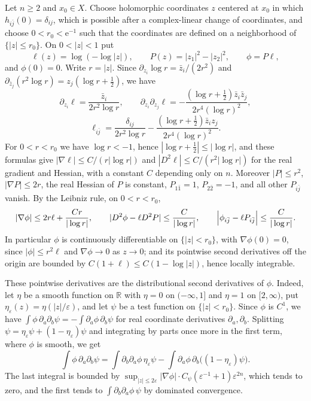 \begin{example}\label{ex:metric-laplacian-unbounded-hessian}
Let $n\geq2$ and $x_0\in X$. Choose holomorphic coordinates $z$ centered at $x_0$ in which $h_{i\bar j}(0)=\delta_{ij}$, which is possible after a complex-linear change of coordinates, and choose $0<r_0<\mathrm e^{-1}$ such that the coordinates are defined on a neighborhood of $\{|z|\leq r_0\}$. On $0<|z|<1$ put
\[
 \ell(z)=\log(-\log|z|),\qquad P(z)=|z_1|^2-|z_2|^2,\qquad \phi=P\ell,
\]
and $\phi(0)=0$. Write $r=|z|$. Since $\partial_{z_i}\log r=\bar z_i/(2r^2)$ and $\partial_{\bar z_j}(r^2\log r)=z_j(\log r+\frac12)$, we have
\[
 \partial_{z_i}\ell=\frac{\bar z_i}{2r^2\log r},\qquad
 \partial_{z_i}\partial_{z_j}\ell=-\frac{(\log r+\frac12)\bar z_i\bar z_j}{2r^4(\log r)^2},
\]
\[
 \ell_{i\bar j}=\frac{\delta_{ij}}{2r^2\log r}-\frac{(\log r+\frac12)\bar z_iz_j}{2r^4(\log r)^2}.
\]
For $0<r<r_0$ we have $\log r<-1$, hence $|\log r+\frac12|\leq|\log r|$, and these formulas give $|\nabla\ell|\leq C/(r|\log r|)$ and $|D^2\ell|\leq C/(r^2|\log r|)$ for the real gradient and Hessian, with a constant $C$ depending only on $n$. Moreover $|P|\leq r^2$, $|\nabla P|\leq2r$, the real Hessian of $P$ is constant, $P_{1\bar1}=1$, $P_{2\bar2}=-1$, and all other $P_{i\bar j}$ vanish. By the Leibniz rule, on $0<r<r_0$,
\[
 |\nabla\phi|\leq2r\ell+\frac{Cr}{|\log r|},\qquad
 |D^2\phi-\ell D^2P|\leq\frac{C}{|\log r|},\qquad
 \Bigl|\phi_{i\bar j}-\ell P_{i\bar j}\Bigr|\leq\frac{C}{|\log r|}.
\]
In particular $\phi$ is continuously differentiable on $\{|z|<r_0\}$, with $\nabla\phi(0)=0$, since $|\phi|\leq r^2\ell$ and $\nabla\phi\to0$ as $z\to0$; and its pointwise second derivatives off the origin are bounded by $C(1+\ell)\leq C(1-\log|z|)$, hence locally integrable.

These pointwise derivatives are the distributional second derivatives of $\phi$. Indeed, let $\eta$ be a smooth function on $\mathbb R$ with $\eta=0$ on $(-\infty,1]$ and $\eta=1$ on $[2,\infty)$, put $\eta_\varepsilon(z)=\eta(|z|/\varepsilon)$, and let $\psi$ be a test function on $\{|z|<r_0\}$. Since $\phi$ is $C^1$, we have $\int\phi\,\partial_a\partial_b\psi=-\int\partial_a\phi\,\partial_b\psi$ for real coordinate derivatives $\partial_a,\partial_b$. Splitting $\psi=\eta_\varepsilon\psi+(1-\eta_\varepsilon)\psi$ and integrating by parts once more in the first term, where $\phi$ is smooth, we get
\[
 \int\phi\,\partial_a\partial_b\psi=\int\partial_b\partial_a\phi\,\eta_\varepsilon\psi-\int\partial_a\phi\,\partial_b\bigl((1-\eta_\varepsilon)\psi\bigr).
\]
The last integral is bounded by $\sup_{|z|\leq2\varepsilon}|\nabla\phi|\cdot C_\psi(\varepsilon^{-1}+1)\varepsilon^{2n}$, which tends to zero, and the first tends to $\int\partial_b\partial_a\phi\,\psi$ by dominated convergence.


\end{example}
